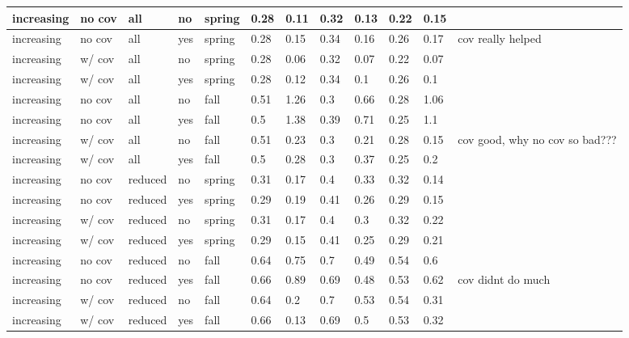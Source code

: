 \documentclass[
]{article}
\begin{document}
\begin{table}
\begin{tabular}[t]{l|l|l|l|l|l|l|l|l|l|l|l}
\hline
increasing & no cov & all & no & spring & 0.28 & 0.11 & 0.32 & 0.13 & 0.22 & 0.15 & \\
\hline
increasing & no cov & all & yes & spring & 0.28 & 0.15 & 0.34 & 0.16 & 0.26 & 0.17 & cov really helped\\
\hline
increasing & w/ cov & all & no & spring & 0.28 & 0.06 & 0.32 & 0.07 & 0.22 & 0.07 & \\
\hline
increasing & w/ cov & all & yes & spring & 0.28 & 0.12 & 0.34 & 0.1 & 0.26 & 0.1 & \\
\hline
increasing & no cov & all & no & fall & 0.51 & 1.26 & 0.3 & 0.66 & 0.28 & 1.06 & \\
\hline
increasing & no cov & all & yes & fall & 0.5 & 1.38 & 0.39 & 0.71 & 0.25 & 1.1 & \\
\hline
increasing & w/ cov & all & no & fall & 0.51 & 0.23 & 0.3 & 0.21 & 0.28 & 0.15 & cov good, why no cov so bad???\\
\hline
increasing & w/ cov & all & yes & fall & 0.5 & 0.28 & 0.3 & 0.37 & 0.25 & 0.2 & \\
\hline
increasing & no cov & reduced & no & spring & 0.31 & 0.17 & 0.4 & 0.33 & 0.32 & 0.14 & \\
\hline
increasing & no cov & reduced & yes & spring & 0.29 & 0.19 & 0.41 & 0.26 & 0.29 & 0.15 & \\
\hline
increasing & w/ cov & reduced & no & spring & 0.31 & 0.17 & 0.4 & 0.3 & 0.32 & 0.22 & \\
\hline
increasing & w/ cov & reduced & yes & spring & 0.29 & 0.15 & 0.41 & 0.25 & 0.29 & 0.21 & \\
\hline
increasing & no cov & reduced & no & fall & 0.64 & 0.75 & 0.7 & 0.49 & 0.54 & 0.6 & \\
\hline
increasing & no cov & reduced & yes & fall & 0.66 & 0.89 & 0.69 & 0.48 & 0.53 & 0.62 & cov didnt do much\\
\hline
increasing & w/ cov & reduced & no & fall & 0.64 & 0.2 & 0.7 & 0.53 & 0.54 & 0.31 & \\
\hline
increasing & w/ cov & reduced & yes & fall & 0.66 & 0.13 & 0.69 & 0.5 & 0.53 & 0.32 & \\
\hline
\end{tabular}
\end{table}
\end{document}
